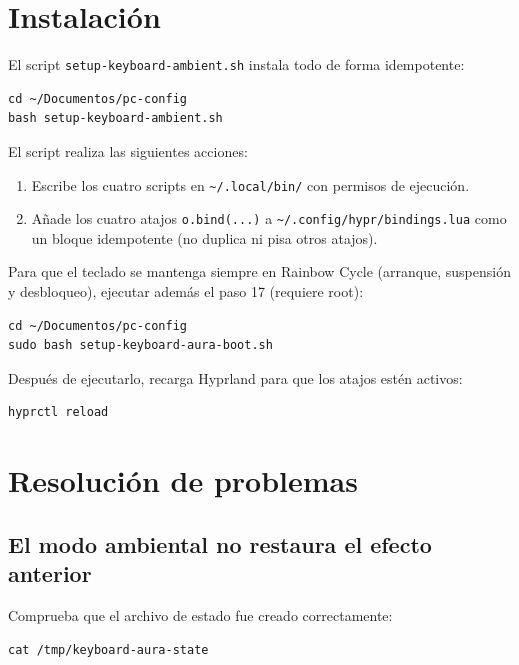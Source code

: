 \documentclass[12pt,a4paper]{article}
\begin{document}
\section{Instalación}

El script \texttt{setup-keyboard-ambient.sh} instala todo de forma idempotente:

\begin{lstlisting}[style=bash]
cd ~/Documentos/pc-config
bash setup-keyboard-ambient.sh
\end{lstlisting}

El script realiza las siguientes acciones:
\begin{enumerate}
  \item Escribe los cuatro scripts en \texttt{\textasciitilde/.local/bin/} con
        permisos de ejecución.
  \item Añade los cuatro atajos \texttt{o.bind(...)} a
        \texttt{\textasciitilde/.config/hypr/bindings.lua} como un bloque
        idempotente (no duplica ni pisa otros atajos).
\end{enumerate}

Para que el teclado se mantenga siempre en Rainbow Cycle (arranque, suspensión
y desbloqueo), ejecutar además el paso 17 (requiere root):

\begin{lstlisting}[style=bash]
cd ~/Documentos/pc-config
sudo bash setup-keyboard-aura-boot.sh
\end{lstlisting}

Después de ejecutarlo, recarga Hyprland para que los atajos estén activos:

\begin{lstlisting}[style=bash]
hyprctl reload
\end{lstlisting}

\section{Resolución de problemas}

\subsection*{El modo ambiental no restaura el efecto anterior}

Comprueba que el archivo de estado fue creado correctamente:

\begin{lstlisting}[style=bash]
cat /tmp/keyboard-aura-state
\end{lstlisting}
\end{document}
